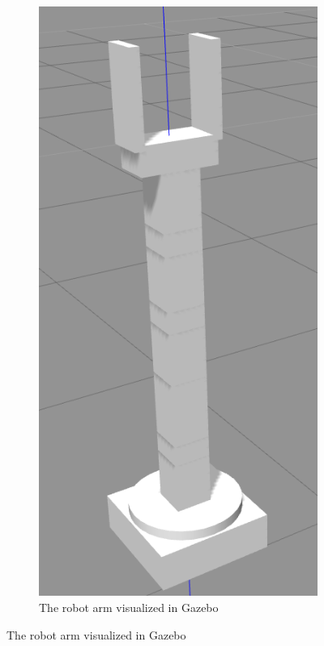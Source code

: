 \begin{figure}[htbp]
\begin{subfigure}[htbp]{0.45\textwidth}
        \includegraphics[width = 1\linewidth]{img/robotGazUP.png}
        \caption{The robot arm visualized in Gazebo}
        \label{fig:robgaz}

\end{subfigure}
\end{figure}
